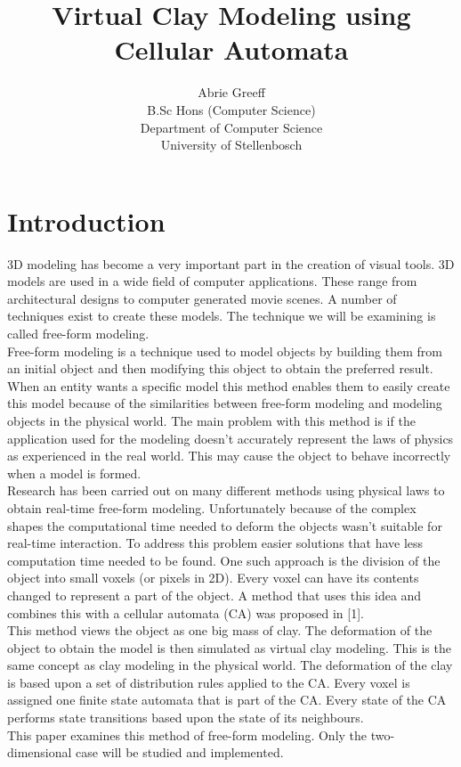 \documentclass[a4paper,11pt,titlepage]{article}
\author{Abrie Greeff\\B.Sc Hons (Computer Science)\\Department of Computer Science\\University of Stellenbosch}
\title{Virtual Clay Modeling using Cellular Automata}
\begin{document}
\maketitle
\tableofcontents
\section{Introduction}
3D modeling has become a very important part in the creation of visual tools. 3D models are used in a wide field of computer applications. These range from architectural designs to computer generated movie scenes. A number of techniques exist to create these models. The technique we will be examining is called free-form modeling.\\
Free-form modeling is a technique used to model objects by building them from an initial object and then modifying this object to obtain the preferred result. When an entity wants a specific model this method enables them to easily create this model because of the similarities between free-form modeling and modeling objects in the physical world. The main problem with this method is if the application used for the modeling doesn't accurately represent the laws of physics as experienced in the real world. This may cause the object to behave incorrectly when a model is formed.\\
Research has been carried out on many different methods using physical laws to obtain real-time free-form modeling. Unfortunately because of the complex shapes the computational time needed to deform the objects wasn't suitable for real-time interaction. To address this problem easier solutions that have less computation time needed to be found. One such approach is the division of the object into small voxels (or pixels in 2D). Every voxel can have its contents changed to represent a part of the object. A method that uses this idea and combines this with a cellular automata (CA) was proposed in [1].\\
This method views the object as one big mass of clay. The deformation of the object to obtain the model is then simulated as virtual clay modeling. This is the same concept as clay modeling in the physical world. The deformation of the clay is based upon a set of distribution rules applied to the CA. Every voxel is assigned one finite state automata that is part of the CA. Every state of the CA performs state transitions based upon the state of its neighbours.\\
This paper examines this method of free-form modeling. Only the two-dimensional case will be studied and implemented.
\end{document}
